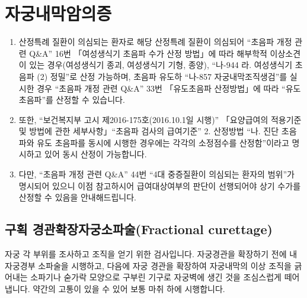 \section{자궁내막암의증}
%
{\begin{enumerate}[1.]\tightlist
\item 산정특례 질환이 의심되는 환자로 해당 산정특례 질환이 의심되어 ``초음파 개정 관련 Q\&A'' 16번 「여성생식기 초음파 수가 산정 방법」에 따라 해부학적 이상소견이 있는 경우(여성생식기 종괴, 여성생식기 기형, 종양), ``나-944 라. 여성생식기 초음파 (2) 정밀''로 산정 가능하며, 초음파 유도하 ``나-857 자궁내막조직생검''를 실시한 경우 ``초음파 개정 관련 Q\&A'' 33번 「유도초음파 산정방법」에 따라 ``유도초음파''를 산정할 수 있습니다.
\item 또한, ``보건복지부 고시 제2016-175호(2016.10.1일 시행)'' 「요양급여의 적용기준 및 방법에 관한 세부사항」``초음파 검사의 급여기준'' 2. 산정방법 ``나. 진단 초음파와 유도 초음파를 동시에 시행한 경우에는 각각의 소정점수를 산정함''이라고 명시하고 있어 동시 산정이 가능합니다.
\item 다만, ``초음파 개정 관련 Q\&A'' 44번 ``4대 중증질환이 의심되는 환자의 범위''가 명시되어 있으니 이점 참고하시어 급여대상여부의 판단이 선행되어야 상기 수가를 산정할 수 있음을 안내해드립니다.
\end{enumerate}} 
\subsection{구획 경관확장자궁소파술(Fractional curettage)}
자궁 각 부위를 조사하고 조직을 얻기 위한 검사입니다. 자궁경관을 확장하기 전에 내자궁경부 소파술을 시행하고, 다음에 자궁 경관을 확장하여 자궁내막의 이상 조직을 긁어내는 소파기나 숟가락 모양으로 구부린 기구로 자궁벽에 생긴 것을 조심스럽게 떼어냅니다. 약간의 고통이 있을 수 있어 보통 마취 하에 시행합니다. \par
